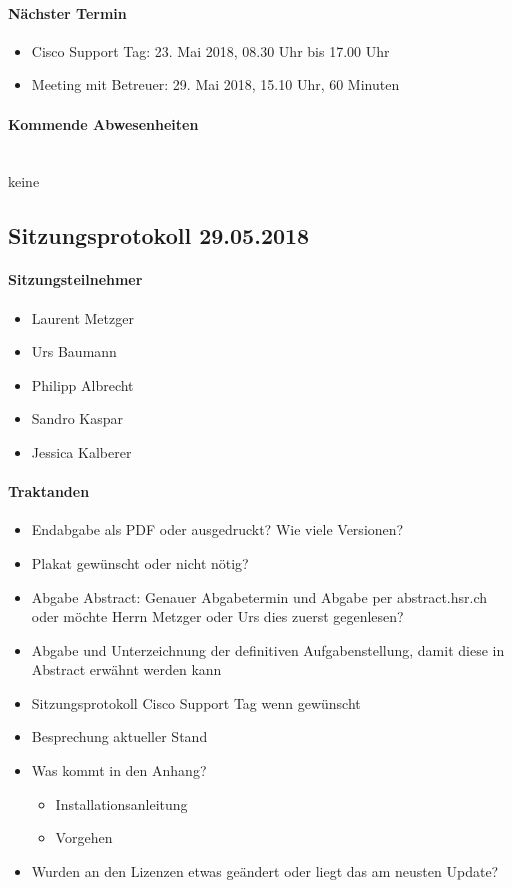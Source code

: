 \paragraph{Nächster Termin}
\begin{itemize}	
	\item Cisco Support Tag: 23. Mai 2018, 08.30 Uhr bis 17.00 Uhr
	\item Meeting mit Betreuer: 29. Mai 2018, 15.10 Uhr, 60 Minuten
\end{itemize}

\paragraph{Kommende Abwesenheiten} \mbox{}\\
keine


\newpage


\subsection{Sitzungsprotokoll 29.05.2018}

\paragraph{Sitzungsteilnehmer}
\begin{itemize}	
	\item Laurent Metzger 
	\item Urs Baumann
	\item Philipp Albrecht
	\item Sandro Kaspar
	\item Jessica Kalberer
\end{itemize}

\paragraph{Traktanden}
\begin{itemize}	
	\item Endabgabe als PDF oder ausgedruckt? Wie viele Versionen?
	\item Plakat gewünscht oder nicht nötig?
	\item Abgabe Abstract: Genauer Abgabetermin und Abgabe per abstract.hsr.ch oder möchte Herrn Metzger oder Urs dies zuerst gegenlesen?
	\item Abgabe und Unterzeichnung der definitiven Aufgabenstellung, damit diese in Abstract erwähnt werden kann
	\item Sitzungsprotokoll Cisco Support Tag wenn gewünscht
	\item Besprechung aktueller Stand
	\item Was kommt in den Anhang?	
	\begin{itemize}
		\item Installationsanleitung
		\item Vorgehen
	\end{itemize}
	\item Wurden an den Lizenzen etwas geändert oder liegt das am neusten Update?
\end{itemize}

